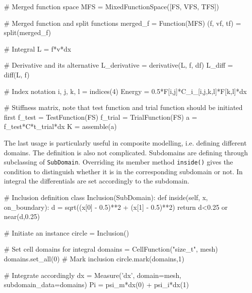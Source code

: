 \begin{python}
# Merged function space
MFS = MixedFunctionSpace([FS, VFS, TFS])

# Merged function and split functions
merged_f = Function(MFS)
(f, vf, tf) = split(merged_f)

# Integral
L = f*v*dx

# Derivative and its alternative
L_derivative = derivative(L, f, df)
L_diff = diff(L, f)

# Index notation
i, j, k, l = indices(4)
Energy = 0.5*F[i,j]*C_i_[i,j,k,l]*F[k,l]*dx

# Stiffness matrix, note that test function and trial function should be initiated first
f_test = TestFunction(FS)
f_trial = TrialFunction(FS)
a = f_test*C*t_trial*dx
K = assemble(a)
\end{python}

The last usage is particularly useful in composite modelling, i.e. defining different domains. The definition is also not complicated. Subdomains are defining through subclassing of \texttt{SubDomain}. Overriding its member method \texttt{inside()} gives the condition to distinguish whether it is in the corresponding subdomain or not. In integral the differentials are set accordingly to the subdomain.

\begin{python}
# Inclusion definition
class Inclusion(SubDomain):
    def inside(self, x, on_boundary):
        d = sqrt((x[0] - 0.5)**2 + (x[1] - 0.5)**2)
        return d<0.25 or near(d,0.25)

# Initiate an instance
circle = Inclusion()

# Set cell domains for integral
domains = CellFunction("size_t", mesh)
domains.set_all(0)
# Mark inclusion
circle.mark(domains,1)

# Integrate accordingly
dx = Measure('dx', domain=mesh, subdomain_data=domains)
Pi = psi_m*dx(0) + psi_i*dx(1)
\end{python}

%
